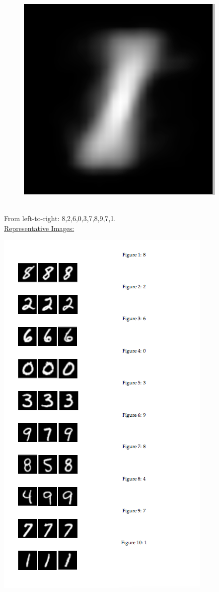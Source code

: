 \documentclass[submit]{harvardml}
\begin{document}
\begin{figure}[h]
		\includegraphics[scale=0.1]{./m5/9}
	\end{figure}
\\\noindent From left-to-right: 8,2,6,0,3,7,8,9,7,1. \\
\underline{Representative Images:}\\
	\centerline{\includegraphics[scale=0.5]{./ALMOST}}
\end{document}
